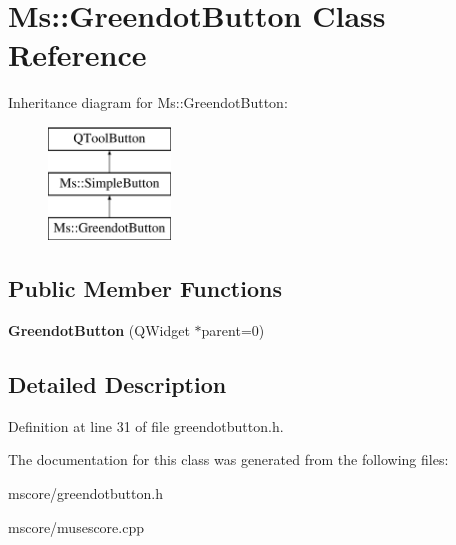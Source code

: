 \hypertarget{class_ms_1_1_greendot_button}{}\section{Ms\+:\+:Greendot\+Button Class Reference}
\label{class_ms_1_1_greendot_button}
Inheritance diagram for Ms\+:\+:Greendot\+Button\+:\begin{figure}[H]
\begin{center}
\leavevmode
\includegraphics[height=3.000000cm]{class_ms_1_1_greendot_button}
\end{center}
\end{figure}
\subsection*{Public Member Functions}
\begin{DoxyCompactItemize}
\item 
\mbox{\label{class_ms_1_1_greendot_button_a23b963064519c2cc19c6493379483ffd}} 
{\bfseries Greendot\+Button} (Q\+Widget $\ast$parent=0)
\end{DoxyCompactItemize}


\subsection{Detailed Description}


Definition at line 31 of file greendotbutton.\+h.



The documentation for this class was generated from the following files\+:\begin{DoxyCompactItemize}
\item 
mscore/greendotbutton.\+h\item 
mscore/musescore.\+cpp\end{DoxyCompactItemize}
